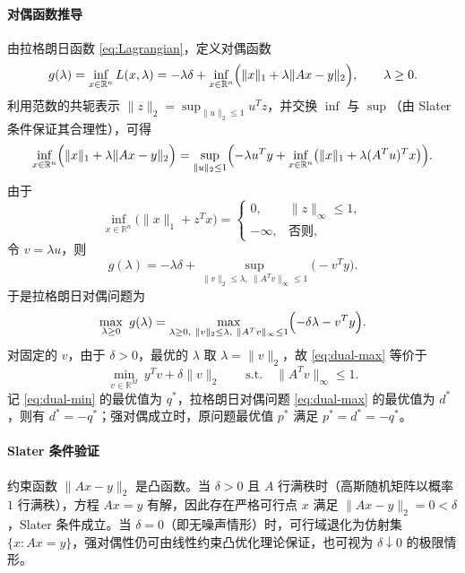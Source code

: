 \documentclass[UTF8]{ctexart}
\numberwithin{figure}{section}
\theoremstyle{definition}
\theoremstyle{examplestyle}
\theoremstyle{remark}
\begin{document}
\paragraph*{对偶函数推导}
由拉格朗日函数 \eqref{eq:Lagrangian}，定义对偶函数
\begin{equation}
\label{eq:dual-function}
g(\lambda)=\inf_{x\in\mathbb{R}^n}L(x,\lambda)
=-\lambda\delta+\inf_{x\in\mathbb{R}^n}\Bigl(\|x\|_1+\lambda\|Ax-y\|_2\Bigr), \qquad \lambda\ge0.
\end{equation}
利用范数的共轭表示 $\|z\|_2=\sup_{\|u\|_2\le1}u^Tz$，并交换 $\inf$ 与 $\sup$（由 Slater 条件保证其合理性），可得
\begin{equation}
\label{eq:dual-inf}
\inf_{x\in\mathbb{R}^n}\Bigl(\|x\|_1+\lambda\|Ax-y\|_2\Bigr)
=\sup_{\|u\|_2\le1}\Bigl(-\lambda u^Ty+\inf_{x\in\mathbb{R}^n}\bigl(\|x\|_1+\lambda(A^Tu)^Tx\bigr)\Bigr).
\end{equation}
由于
\[
\inf_{x\in\mathbb{R}^n}\bigl(\|x\|_1+z^Tx\bigr)=
\begin{cases}
0, & \|z\|_\infty\le1,\\
-\infty, & \text{否则},
\end{cases}
\]
令 $v=\lambda u$，则
\begin{equation}
\label{eq:dual-g}
g(\lambda)=-\lambda\delta+\sup_{\|v\|_2\le\lambda,\ \|A^Tv\|_\infty\le1}\bigl(-v^Ty\bigr).
\end{equation}
于是拉格朗日对偶问题为
\begin{equation}
\label{eq:dual-max}
\max_{\lambda\ge0}\ g(\lambda)
=\max_{\lambda\ge0,\ \|v\|_2\le\lambda,\ \|A^Tv\|_\infty\le1}\Bigl(-\delta\lambda-v^Ty\Bigr).
\end{equation}
对固定的 $v$，由于 $\delta>0$，最优的 $\lambda$ 取 $\lambda=\|v\|_2$，故 \eqref{eq:dual-max} 等价于
\begin{equation}
\label{eq:dual-min}
\min_{v\in\mathbb{R}^M}\ y^Tv+\delta\|v\|_2 \qquad \text{s.t.} \quad \|A^Tv\|_\infty\le1.
\end{equation}
记 \eqref{eq:dual-min} 的最优值为 $q^*$，拉格朗日对偶问题 \eqref{eq:dual-max} 的最优值为 $d^*$，则有 $d^*=-q^*$；强对偶成立时，原问题最优值 $p^*$ 满足 $p^*=d^*=-q^*$。

\paragraph*{Slater 条件验证}
约束函数 $\|Ax-y\|_2$ 是凸函数。当 $\delta>0$ 且 $A$ 行满秩时（高斯随机矩阵以概率 $1$ 行满秩），方程 $Ax=y$ 有解，因此存在严格可行点 $x$ 满足 $\|Ax-y\|_2=0<\delta$，Slater 条件成立。当 $\delta=0$（即无噪声情形）时，可行域退化为仿射集 $\{x:Ax=y\}$，强对偶性仍可由线性约束凸优化理论保证，也可视为 $\delta\downarrow0$ 的极限情形。
\end{document}
